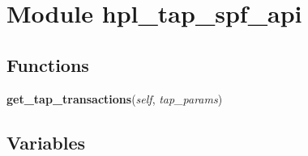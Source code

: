 %
%
%


\section{Module hpl\_tap\_spf\_api}

    \label{hpl_tap_spf_api}


  \subsection{Functions}

    \label{hpl_tap_spf_api:get_tap_transactions}

    \vspace{0.5ex}

\hspace{.8\funcindent}\begin{boxedminipage}{\funcwidth}

    \raggedright \textbf{get\_tap\_transactions}(\textit{self}, \textit{tap\_params})

\setlength{\parskip}{2ex}
\setlength{\parskip}{1ex}
    \end{boxedminipage}



  \subsection{Variables}

